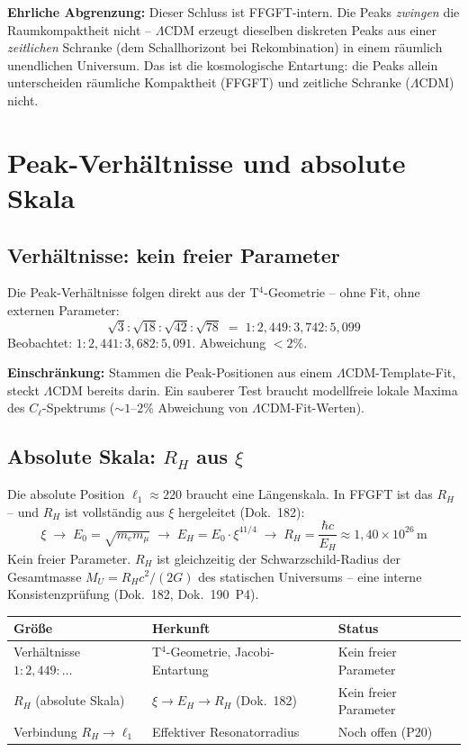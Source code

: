 \textbf{Ehrliche Abgrenzung:} Dieser Schluss ist FFGFT-intern. Die
Peaks \emph{zwingen} die Raumkompaktheit nicht -- $\Lambda$CDM erzeugt
dieselben diskreten Peaks aus einer \emph{zeitlichen} Schranke (dem
Schallhorizont bei Rekombination) in einem räumlich unendlichen
Universum. Das ist die kosmologische Entartung: die Peaks allein
unterscheiden räumliche Kompaktheit (FFGFT) und zeitliche Schranke
($\Lambda$CDM) nicht.

\section{Peak-Verhältnisse und absolute Skala}

\subsection*{Verhältnisse: kein freier Parameter}

Die Peak-Verhältnisse folgen direkt aus der T$^4$-Geometrie --
ohne Fit, ohne externen Parameter:
\[
  \sqrt{3}:\sqrt{18}:\sqrt{42}:\sqrt{78}
  \;=\; 1:2{,}449:3{,}742:5{,}099
\]
Beobachtet: $1:2{,}441:3{,}682:5{,}091$. Abweichung $< 2\%$.

\textbf{Einschränkung:} Stammen die Peak-Positionen aus einem
$\Lambda$CDM-Template-Fit, steckt $\Lambda$CDM bereits darin.
Ein sauberer Test braucht modellfreie lokale Maxima des
$C_\ell$-Spektrums ($\sim 1$--$2\%$ Abweichung von
$\Lambda$CDM-Fit-Werten).

\subsection*{Absolute Skala: $R_H$ aus $\xi$}

Die absolute Position $\ell_1 \approx 220$ braucht eine Längenskala.
In FFGFT ist das $R_H$ -- und $R_H$ ist vollständig aus $\xi$
hergeleitet (Dok.~182):
\[
  \xi \;\to\; E_0 = \sqrt{m_e m_\mu} \;\to\;
  E_H = E_0 \cdot \xi^{41/4} \;\to\;
  R_H = \frac{\hbar c}{E_H} \approx 1{,}40 \times 10^{26}\,\text{m}
\]
Kein freier Parameter. $R_H$ ist gleichzeitig der
Schwarzschild-Radius der Gesamtmasse $M_U = R_H c^2/(2G)$
des statischen Universums -- eine interne Konsistenzprüfung
(Dok.~182, Dok.~190~P4).

\begin{center}
\begin{tabular}{p{3.5cm}p{4.5cm}p{3.5cm}}
\toprule
\textbf{Größe} & \textbf{Herkunft} & \textbf{Status} \\
\midrule
Verhältnisse $1:2{,}449:\ldots$ &
  T$^4$-Geometrie, Jacobi-Entartung &
  Kein freier Parameter \\
\addlinespace
$R_H$ (absolute Skala) &
  $\xi \to E_H \to R_H$ (Dok.~182) &
  Kein freier Parameter \\
\addlinespace
Verbindung $R_H \to \ell_1$ &
  Effektiver Resonatorradius &
  Noch offen (P20) \\
\bottomrule
\end{tabular}
\end{center}

